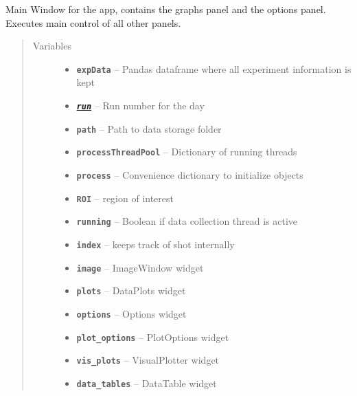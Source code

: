 \documentclass[letterpaper,10pt,english]{sphinxmanual}
\begin{document}
\begin{fulllineitems}
\label{MainWindow:SpinorMonitor.MainWindow}
Main Window for the app, contains the graphs panel and the options
panel.  Executes main control of all other panels.
\begin{quote}\begin{description}
\item[{Variables}] \leavevmode\begin{itemize}
\item {} 
\textbf{\texttt{expData}} -- Pandas dataframe where all experiment information is kept

\item {} 
{\hyperref[ProcessImage:Image.ProcessImage.run]{\emph{\textbf{\texttt{run}}}}} -- Run number for the day

\item {} 
\textbf{\texttt{path}} -- Path to data storage folder

\item {} 
\textbf{\texttt{processThreadPool}} -- Dictionary of running threads

\item {} 
\textbf{\texttt{process}} -- Convenience dictionary to initialize objects

\item {} 
\textbf{\texttt{ROI}} -- region of interest

\item {} 
\textbf{\texttt{running}} -- Boolean if data collection thread is active

\item {} 
\textbf{\texttt{index}} -- keeps track of shot internally

\item {} 
\textbf{\texttt{image}} -- ImageWindow widget

\item {} 
\textbf{\texttt{plots}} -- DataPlots widget

\item {} 
\textbf{\texttt{options}} -- Options widget

\item {} 
\textbf{\texttt{plot\_options}} -- PlotOptions widget

\item {} 
\textbf{\texttt{vis\_plots}} -- VisualPlotter widget

\item {} 
\textbf{\texttt{data\_tables}} -- DataTable widget


\end{itemize}
\end{description}
\end{quote}
\end{fulllineitems}
\end{document}
